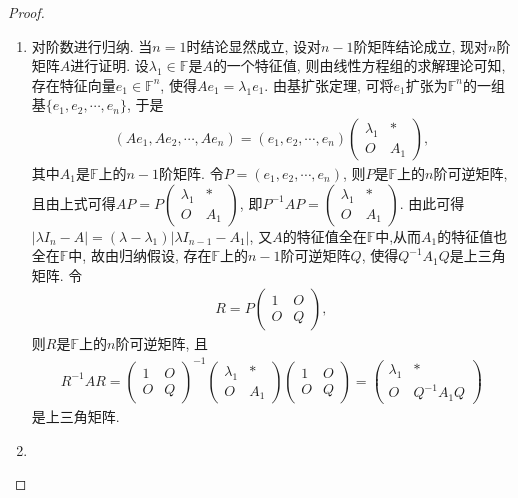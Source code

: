 \documentclass[../../main.tex]{subfiles}
\begin{document}
\begin{proof}
\begin{enumerate}
\item 对阶数进行归纳. 当\(n = 1\)时结论显然成立, 设对\(n - 1\)阶矩阵结论成立, 现对\(n\)阶矩阵\(A\)进行证明. 设\(\lambda_{1} \in \mathbb{F}\)是\(A\)的一个特征值, 则由线性方程组的求解理论可知, 存在特征向量\(e_{1} \in \mathbb{F}^n\), 使得\(Ae_{1}=\lambda_{1}e_{1}\). 由基扩张定理, 可将\(e_{1}\)扩张为\(\mathbb{F}^n\)的一组基\(\{e_{1},e_{2},\cdots ,e_{n}\}\), 于是
\begin{align*}
(Ae_{1},Ae_{2},\cdots ,Ae_{n})=(e_{1},e_{2},\cdots ,e_{n})\begin{pmatrix}
\lambda_{1}& *\\
O&A_{1}
\end{pmatrix},
\end{align*}
其中\(A_{1}\)是\(\mathbb{F}\)上的\(n - 1\)阶矩阵. 令\(P=(e_{1},e_{2},\cdots ,e_{n})\), 则\(P\)是\(\mathbb{F}\)上的\(n\)阶可逆矩阵, 且由上式可得\(AP = P\begin{pmatrix}
\lambda_{1}& *\\
O&A_{1}
\end{pmatrix}\), 即\(P^{-1}AP=\begin{pmatrix}
\lambda_{1}& *\\
O&A_{1}
\end{pmatrix}\). 由此可得\(|\lambda I_{n}-A| = (\lambda - \lambda_{1})|\lambda I_{n - 1}-A_{1}|\), 又$A$的特征值全在$\mathbb{F}$中,从而\(A_{1}\)的特征值也全在\(\mathbb{F}\)中, 故由归纳假设, 存在\(\mathbb{F}\)上的\(n - 1\)阶可逆矩阵\(Q\), 使得\(Q^{-1}A_{1}Q\)是上三角矩阵. 令
\begin{align*}
R = P\begin{pmatrix}
1& O\\
O& Q
\end{pmatrix},
\end{align*}
则\(R\)是\(\mathbb{F}\)上的\(n\)阶可逆矩阵, 且
\begin{align*}
R^{-1}AR=\begin{pmatrix}
1& O\\
O& Q
\end{pmatrix}^{-1}\begin{pmatrix}
\lambda_{1}& *\\
O&A_{1}
\end{pmatrix}\begin{pmatrix}
1& O\\
O& Q
\end{pmatrix}=\begin{pmatrix}
\lambda_{1}& *\\
O&Q^{-1}A_{1}Q
\end{pmatrix}
\end{align*}
是上三角矩阵. 

\item 
\end{enumerate}

\end{proof}
\end{document}
